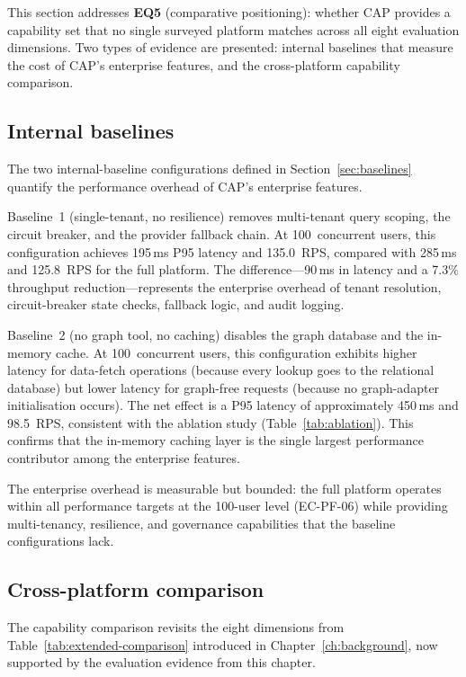 \documentclass[a4paper,noexaminfo]{sapthesis}
\begin{document}
This section addresses \textbf{EQ5} (comparative positioning): whether
CAP provides a capability set that no single surveyed platform matches
across all eight evaluation dimensions.  Two types of evidence are
presented: internal baselines that measure the cost of CAP's enterprise
features, and the cross-platform capability comparison.

\subsection{Internal baselines}

The two internal-baseline configurations defined in
Section~\ref{sec:baselines} quantify the performance overhead of CAP's
enterprise features.

Baseline~1 (single-tenant, no resilience) removes multi-tenant query
scoping, the circuit breaker, and the provider fallback chain.  At
100~concurrent users, this configuration achieves 195\,ms P95 latency
and 135.0~RPS, compared with 285\,ms and 125.8~RPS for the full
platform.  The difference---90\,ms in latency and a 7.3\% throughput
reduction---represents the enterprise overhead of tenant resolution,
circuit-breaker state checks, fallback logic, and audit logging.

Baseline~2 (no graph tool, no caching) disables the graph database and
the in-memory cache.  At 100~concurrent users, this configuration
exhibits higher latency for data-fetch operations (because every lookup
goes to the relational database) but lower latency for graph-free
requests (because no graph-adapter initialisation occurs).  The net
effect is a P95 latency of approximately 450\,ms and 98.5~RPS,
consistent with the ablation study (Table~\ref{tab:ablation}).  This
confirms that the in-memory caching layer is the single largest
performance contributor among the enterprise features.

The enterprise overhead is measurable but bounded: the full platform
operates within all performance targets at the 100-user level (EC-PF-06)
while providing multi-tenancy, resilience, and governance capabilities
that the baseline configurations lack.

\subsection{Cross-platform comparison}

The capability comparison revisits the eight dimensions from
Table~\ref{tab:extended-comparison} introduced in
Chapter~\ref{ch:background}, now supported by the evaluation evidence
from this chapter.
\end{document}
